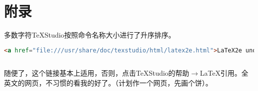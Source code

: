 \documentclass[10pt,a4paper]{article}
\begin{document}
	\section{附录}
	多数字符TeXStudio按照命令名称大小进行了升序排序。
	\begin{center}
	
		\begin{lstlisting}[language={html}]
	<a href="file:///usr/share/doc/texstudio/html/latex2e.html">LaTeX2e unofficial reference manual (July 2018)</a>
	
	\end{lstlisting}	
	
	\end{center}
随便了，这个链接基本上适用，否则，点击TeXStudio的帮助$\to$LaTeX引用。全英文的网页，不习惯的看我的好了。（计划作一个网页，先画个饼）。
\end{document}

